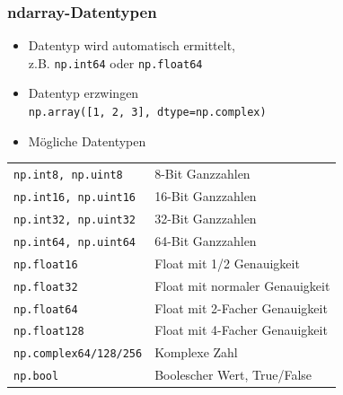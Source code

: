 \begin{minipage}[t]{0.54\textwidth}
	\subsubsection{ndarray-Datentypen}
	\begin{itemize}
		\item Datentyp wird automatisch ermittelt,\\
		z.B. \texttt{np.int64} oder \texttt{np.float64}
		\item Datentyp erzwingen\\
		\texttt{np.array([1, 2, 3], dtype=np.complex)}
		\item Mögliche Datentypen\\
	\end{itemize}

\begin{tabular}{|l|l|}
	\hline 
	\texttt{np.int8, np.uint8} &8-Bit Ganzzahlen\\ 
	\texttt{np.int16, np.uint16} &16-Bit Ganzzahlen\\ 
	\texttt{np.int32, np.uint32} &32-Bit Ganzzahlen\\ 
	\texttt{np.int64, np.uint64} &64-Bit Ganzzahlen\\ 
	\texttt{np.float16} &Float mit 1/2 Genauigkeit\\ 
	\texttt{np.float32} &Float mit normaler Genauigkeit\\ 
	\texttt{np.float64} &Float mit 2-Facher Genauigkeit\\ 
	\texttt{np.float128} &Float mit 4-Facher Genauigkeit\\  
	\texttt{np.complex64/128/256} &Komplexe Zahl\\ 
	\texttt{np.bool} &Boolescher Wert, True/False\\ 
	\hline 
\end{tabular} 

\end{minipage}
\hspace{0.02\textwidth}

